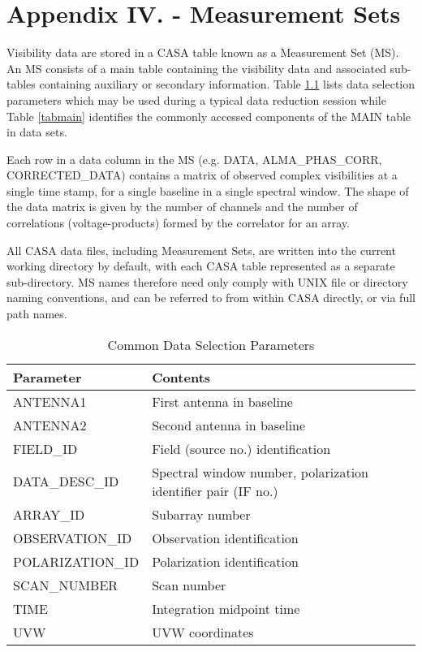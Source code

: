 \chapter{Appendix IV. - Measurement Sets}
\label{chapter:app.4}

Visibility data are stored in a CASA table known as a
Measurement Set (MS).  An MS consists of a main table containing the
visibility data and associated sub-tables containing auxiliary or
secondary information.  Table \ref{tabselect} lists data selection
parameters which may be used during a typical data reduction session
while Table \ref{tabmain} identifies the commonly accessed components
of the MAIN table in data sets.

Each row in a data column in the MS (e.g. DATA, ALMA\_PHAS\_CORR,
CORRECTED\_DATA) contains a matrix of observed complex visibilities at
a single time stamp, for a single baseline in a single spectral
window.  The shape of the data matrix is given by the number of
channels and the number of correlations (voltage-products) formed by
the correlator for an array.  

All CASA data files, including Measurement Sets, are written into
the current working directory by default, with each CASA table
represented as a separate sub-directory.  MS names therefore need only
comply with UNIX file or directory naming conventions, and can be
referred to from within CASA directly, or via full path names.


\vspace{5mm}
\begin{table}[h!]
\caption[Common Data Selection Parameters]
        {\label{tabselect} Common Data Selection Parameters}
\begin{center}
\begin{tabular}{|ll|} \hline
{\bf Parameter}   &   {\bf Contents}                  \\
\hline
\hline
ANTENNA1      &   First antenna in baseline   \\
ANTENNA2      &   Second antenna in baseline  \\
FIELD\_ID      &   Field (source no.) identification  \\
DATA\_DESC\_ID  &   Spectral window number, polarization identifier pair (IF no.)  \\
ARRAY\_ID      &   Subarray number                \\
OBSERVATION\_ID  &   Observation identification   \\
POLARIZATION\_ID  &   Polarization identification \\ 
SCAN\_NUMBER   &   Scan number                    \\
TIME          &   Integration midpoint time      \\
UVW           &   UVW coordinates                \\
\hline
\end{tabular}
\end{center}
\end{table}

